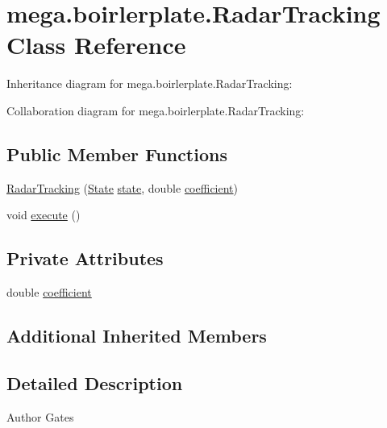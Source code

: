 \hypertarget{classmega_1_1boirlerplate_1_1_radar_tracking}{}\section{mega.\+boirlerplate.\+Radar\+Tracking Class Reference}
\label{classmega_1_1boirlerplate_1_1_radar_tracking}


Inheritance diagram for mega.\+boirlerplate.\+Radar\+Tracking\+:


Collaboration diagram for mega.\+boirlerplate.\+Radar\+Tracking\+:
\subsection*{Public Member Functions}
\begin{DoxyCompactItemize}
\item 
\hyperlink{classmega_1_1boirlerplate_1_1_radar_tracking_ad2c8701dfdda6182cc3209f9b6d54a24}{Radar\+Tracking} (\hyperlink{classmega_1_1boirlerplate_1_1_state}{State} \hyperlink{classmega_1_1boirlerplate_1_1_component_a87b0d70f323b5fee60a200e07c9c20fd}{state}, double \hyperlink{classmega_1_1boirlerplate_1_1_radar_tracking_ab2858537068dfb781c839ce96b2363c2}{coefficient})
\item 
void \hyperlink{classmega_1_1boirlerplate_1_1_radar_tracking_a80f37cb8ed25790d601f40ce52a81f05}{execute} ()
\end{DoxyCompactItemize}
\subsection*{Private Attributes}
\begin{DoxyCompactItemize}
\item 
double \hyperlink{classmega_1_1boirlerplate_1_1_radar_tracking_ab2858537068dfb781c839ce96b2363c2}{coefficient}
\end{DoxyCompactItemize}
\subsection*{Additional Inherited Members}


\subsection{Detailed Description}
\begin{DoxyAuthor}{Author}
Gates 
\end{DoxyAuthor}


